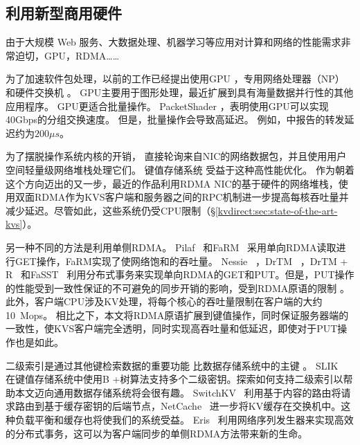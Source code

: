 \subsection{利用新型商用硬件}


由于大规模 Web 服务、大数据处理、机器学习等应用对计算和网络的性能需求非常迫切，GPU，RDMA……


为了加速软件包处理，以前的工作已经提出使用GPU \cite {packetshader}，专用网络处理器（NP）\cite {cavium,netronome} 和硬件交换机 \cite {duet}。
GPU主要用于图形处理，最近扩展到具有海量数据并行性的其他应用程序。 GPU更适合批量操作。 PacketShader \cite {packetshader}，表明使用GPU可以实现40Gbps的分组交换速度。
但是，批量操作会导致高延迟。
例如，\cite {packetshader}中报告的转发延迟约为$200 \mu{}s$。



为了摆脱操作系统内核的开销， \cite {rizzo2012netmap,intel2014data}直接轮询来自NIC的网络数据包，并且\cite {jeong2014mtcp,marinos2014network}使用用户空间轻量级网络堆栈处理它们。
键值存储系统 \cite {kapoor2012chronos,ousterhout2010case,ousterhout2015ramcloud,lim2014mica,li2016full}受益于这种高性能优化。
作为朝着这个方向迈出的又一步，最近的作品\cite {infiniband2000infiniband,kalia2014using,kalia2016design,kalia2014using,kalia2016design}利用RDMA NIC的基于硬件的网络堆栈，使用双面RDMA作为KVS客户端和服务器之间的RPC机制进一步提高每核吞吐量并减少延迟。尽管如此，这些系统仍受CPU限制（\S \ref {kvdirect:sec:state-of-the-art-kvs}）。

另一种不同的方法是利用单侧RDMA。 Pilaf~ \cite {mitchell2013using}和FaRM~ \cite {dragojevic2014farm}采用单向RDMA读取进行GET操作，FaRM实现了使网络饱和的吞吐量。 Nessie~ \cite {szepesi2014designing}，DrTM~ \cite {wei2015fast}，DrTM + R~ \cite {chen2016fast}和FaSST~ \cite {kalia2016fasst}利用分布式事务来实现单向RDMA的GET和PUT。但是，PUT操作的性能受到一致性保证的不可避免的同步开销的影响，受到RDMA原语的限制 \cite {kalia2016design}。此外，客户端CPU涉及KV处理，将每个核心的吞吐量限制在客户端的大约10~Mops。
相比之下，本文将RDMA原语扩展到键值操作，同时保证服务器端的一致性，使KVS客户端完全透明，同时实现高吞吐量和低延迟，即使对于PUT操作也是如此。

二级索引是通过其他键检索数据的重要功能
比数据存储系统中的主键 \cite {escriva2012hyperdex,kejriwal2016slik}。 SLIK~ \cite {kejriwal2016slik}在键值存储系统中使用B +树算法支持多个二级密钥。探索如何支持二级索引以帮助本文迈向通用数据存储系统将会很有趣。 SwitchKV~ \cite {li2016fast}利用基于内容的路由将请求路由到基于缓存密钥的后端节点，NetCache~ \cite {netcache-sosp17}进一步将KV缓存在交换机中。这种负载平衡和缓存也将使我们的系统受益。
Eris~ \cite {eris}利用网络序列发生器来实现高效的分布式事务，这可以为客户端同步的单侧RDMA方法带来新的生命。

